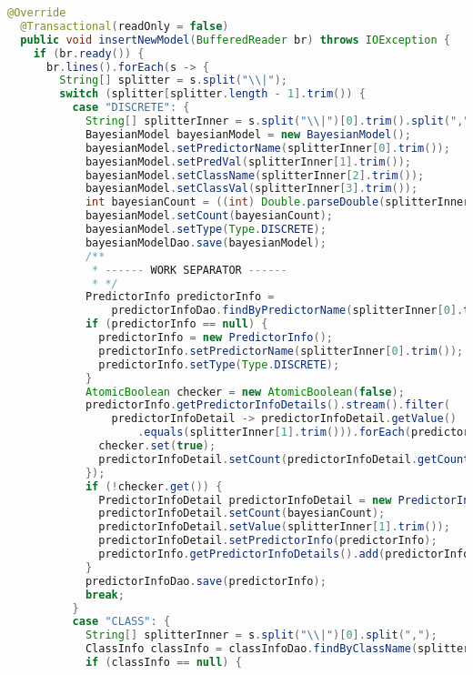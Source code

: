 \begin{lstlisting}[language=Java,basicstyle=\tiny,caption=BayesianModelService.java]
  @Override
  @Transactional(readOnly = false)
  public void insertNewModel(BufferedReader br) throws IOException {
    if (br.ready()) {
      br.lines().forEach(s -> {
        String[] splitter = s.split("\\|");
        switch (splitter[splitter.length - 1].trim()) {
          case "DISCRETE": {
            String[] splitterInner = s.split("\\|")[0].trim().split(",");
            BayesianModel bayesianModel = new BayesianModel();
            bayesianModel.setPredictorName(splitterInner[0].trim());
            bayesianModel.setPredVal(splitterInner[1].trim());
            bayesianModel.setClassName(splitterInner[2].trim());
            bayesianModel.setClassVal(splitterInner[3].trim());
            int bayesianCount = ((int) Double.parseDouble(splitterInner[4].trim()));
            bayesianModel.setCount(bayesianCount);
            bayesianModel.setType(Type.DISCRETE);
            bayesianModelDao.save(bayesianModel);
            /**
             * ------ WORK SEPARATOR ------
             * */
            PredictorInfo predictorInfo =
                predictorInfoDao.findByPredictorName(splitterInner[0].trim());
            if (predictorInfo == null) {
              predictorInfo = new PredictorInfo();
              predictorInfo.setPredictorName(splitterInner[0].trim());
              predictorInfo.setType(Type.DISCRETE);
            }
            AtomicBoolean checker = new AtomicBoolean(false);
            predictorInfo.getPredictorInfoDetails().stream().filter(
                predictorInfoDetail -> predictorInfoDetail.getValue()
                    .equals(splitterInner[1].trim())).forEach(predictorInfoDetail -> {
              checker.set(true);
              predictorInfoDetail.setCount(predictorInfoDetail.getCount() + bayesianCount);
            });
            if (!checker.get()) {
              PredictorInfoDetail predictorInfoDetail = new PredictorInfoDetail();
              predictorInfoDetail.setCount(bayesianCount);
              predictorInfoDetail.setValue(splitterInner[1].trim());
              predictorInfoDetail.setPredictorInfo(predictorInfo);
              predictorInfo.getPredictorInfoDetails().add(predictorInfoDetail);
            }
            predictorInfoDao.save(predictorInfo);
            break;
          }
          case "CLASS": {
            String[] splitterInner = s.split("\\|")[0].split(",");
            ClassInfo classInfo = classInfoDao.findByClassName(splitterInner[0].trim());
            if (classInfo == null) {

\end{lstlisting}
